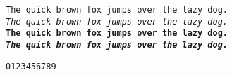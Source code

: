 \documentclass{article}
\begin{document}
\noindent
\texttt{The quick brown fox jumps over the lazy dog.} \\
\texttt{\textit{The quick brown fox jumps over the lazy dog.}} \\
\texttt{\textbf{The quick brown fox jumps over the lazy dog.}} \\
\texttt{\textbf{\textit{The quick brown fox jumps over the lazy dog.}}}

\noindent
\texttt{0123456789} \\
\texttt{}

\end{document}

